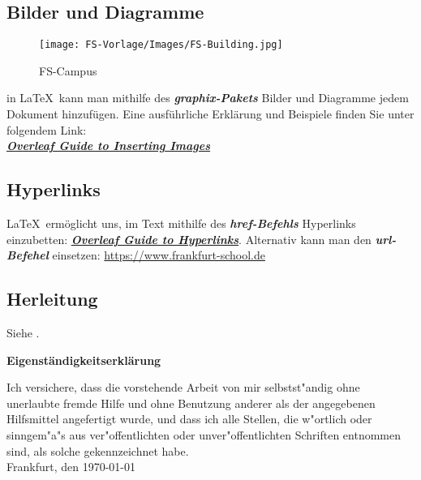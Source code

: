 \documentclass[12pt,a4paper]{article}
\begin{document}
\subsection{Bilder und Diagramme}
\begin{figure}[h]
\texttt{[image: FS-Vorlage/Images/FS-Building.jpg]}
\caption{FS-Campus} \centering\cite{fs}
\end{figure}
in \LaTeX\ kann man mithilfe des {\textbf{\emph {graphix-Pakets}}} Bilder und Diagramme jedem Dokument hinzufügen. Eine ausführliche Erklärung und Beispiele finden Sie unter folgendem Link:\\
\href{https://de.overleaf.com/learn/latex/Inserting_Images}{\textbf{\emph{Overleaf Guide to Inserting Images}}}

\subsection{Hyperlinks}
\LaTeX\ ermöglicht uns, im Text mithilfe des \textbf{\emph{href-Befehls}}  Hyperlinks einzubetten:\newline
\href{https://www.overleaf.com/learn/latex/Hyperlinks}{\textbf{\emph{Overleaf Guide to Hyperlinks}}}.\newline
Alternativ kann man den {\textbf{\emph{url-Befehel}}} einsetzen: \url{https://www.frankfurt-school.de}

\begin{appendix}
\section{Herleitung}
Siehe \citet{sandmann}.

\end{appendix}




\newpage
\markboth{}{}

\newpage
{} %
\renewcommand{\refname}{Literaturverzeichnis}


\newpage
\thispagestyle{empty}
\markboth{}{}
  \normalsize
\begin{center}
\huge{\bf Eigenständigkeitserklärung}\\[40mm]
\end{center}
\large
Ich versichere, dass die vorstehende Arbeit von mir selbstst"andig ohne unerlaubte fremde Hilfe und ohne Benutzung anderer als der angegebenen Hilfsmittel angefertigt wurde, und dass ich alle Stellen, die w"ortlich oder sinngem"a"s aus ver"offentlichten oder unver"offentlichten Schriften entnommen sind, als solche gekennzeichnet habe.\\[50mm]
Frankfurt, den \today

\newpage
\end{document}
